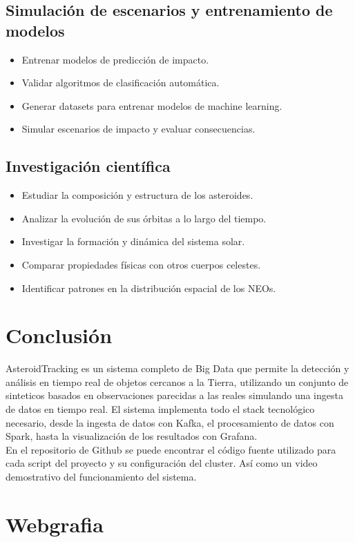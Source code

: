 \documentclass[12pt]{article}
\begin{document}
\subsection{Simulación de escenarios y entrenamiento de modelos}
\begin{itemize}
  \item Entrenar modelos de predicción de impacto.
  \item Validar algoritmos de clasificación automática.
  \item Generar datasets para entrenar modelos de machine learning.
  \item Simular escenarios de impacto y evaluar consecuencias.
\end{itemize}
\subsection{Investigación científica}
\begin{itemize}
  \item Estudiar la composición y estructura de los asteroides.
  \item Analizar la evolución de sus órbitas a lo largo del tiempo.
  \item Investigar la formación y dinámica del sistema solar.
  \item Comparar propiedades físicas con otros cuerpos celestes.
  \item Identificar patrones en la distribución espacial de los NEOs.
\end{itemize}

\clearpage

\section{Conclusión}

AsteroidTracking es un sistema completo de Big Data que permite la detección y análisis en tiempo real de objetos cercanos a la Tierra,
utilizando un conjunto de sinteticos basados en observaciones parecidas a las reales simulando una ingesta de datos en tiempo real.
El sistema implementa todo el stack tecnológico necesario, desde la ingesta de datos con Kafka, el procesamiento de datos con Spark,
hasta la visualización de los resultados con Grafana.
\\
En el repositorio de Github se puede encontrar el código fuente utilizado para cada script del proyecto y su configuración del cluster. Así como
un video demostrativo del funcionamiento del sistema.

\clearpage

\section{Webgrafia}

\cite{neows-api}
\cite{Sentry-System}
\cite{joke2k-faker}
\cite{numpy}
\cite{spark}
\cite{kafka}
\cite{prometheus}
\cite{grafana}
\cite{Standard-asteroids-physical-characteristics}
\cite{Movimiento-Orbital}
\cite{Impact-probability}


\printbibliography
\end{document}
